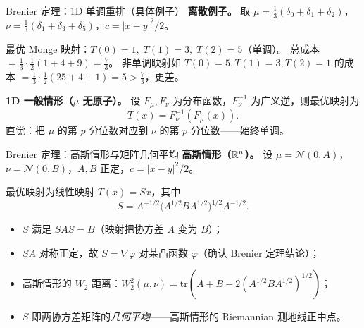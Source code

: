 \begin{frame}{Brenier 定理：1D 单调重排（具体例子）}
  \textbf{离散例子。} 取 $\mu=\tfrac{1}{3}(\delta_{0}+\delta_{1}+\delta_{2})$，$\nu=\tfrac{1}{3}(\delta_{1}+\delta_{3}+\delta_{5})$，$c=|x-y|^2/2$。

  最优 Monge 映射：$T(0)=1,\;T(1)=3,\;T(2)=5$（单调）。
  总成本 $=\tfrac{1}{3}\cdot\tfrac{1}{2}(1+4+9)=\tfrac{7}{3}$。
  非单调映射如 $T(0)=5,T(1)=3,T(2)=1$ 的成本 $=\tfrac{1}{3}\cdot\tfrac{1}{2}(25+4+1)=5>\tfrac{7}{3}$，更差。

  \textbf{1D 一般情形（$\mu$ 无原子）。} 设 $F_\mu,F_\nu$ 为分布函数，$F_\nu^{-1}$ 为广义逆，则最优映射为
  \[
    T(x) = F_{\nu}^{-1}(F_{\mu}(x)).
  \]
  直觉：把 $\mu$ 的第 $p$ 分位数对应到 $\nu$ 的第 $p$ 分位数——始终单调。

\end{frame}

\begin{frame}{Brenier 定理：高斯情形与矩阵几何平均}
  \textbf{高斯情形（$\mathbb{R}^n$）。} 设 $\mu=\mathcal{N}(0,A)$，$\nu=\mathcal{N}(0,B)$，$A,B$ 正定，$c=|x-y|^2/2$。

  最优映射为线性映射 $T(x)=Sx$，其中
  \[
    S = A^{-1/2}\bigl(A^{1/2}BA^{1/2}\bigr)^{1/2}A^{-1/2}.
  \]
  \begin{itemize}\small
    \item $S$ 满足 $S A S = B$（映射把协方差 $A$ 变为 $B$）；
    \item $SA$ 对称正定，故 $S=\nabla\varphi$ 对某凸函数 $\varphi$（确认 Brenier 定理结论）；
    \item 高斯情形的 $W_2$ 距离：$W_2^2(\mu,\nu)=\mathrm{tr}(A+B-2(A^{1/2}BA^{1/2})^{1/2})$；
    \item $S$ 即两协方差矩阵的\emph{几何平均}——高斯情形的 Riemannian 测地线正中点。
  \end{itemize}

\end{frame}

